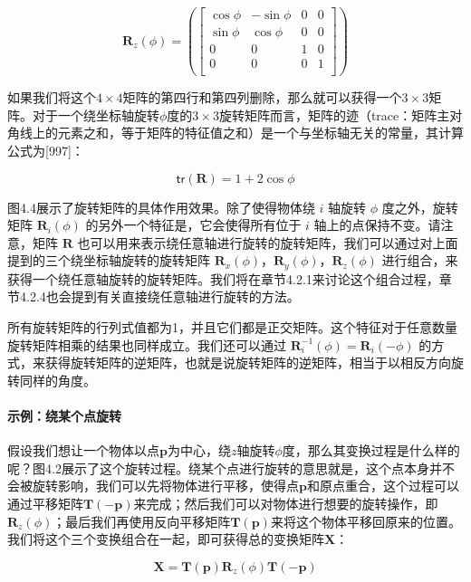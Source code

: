 \documentclass[
  paper=a4,
  ,captions=tableheading
]{scrartcl}
\begin{document}
\[
  \mathbf{R}_z(\phi) =
  \left (
  \begin{bmatrix}
      \cos \phi & -\sin \phi & 0 & 0 \\
      \sin \phi & \cos \phi  & 0 & 0 \\
      0         & 0          & 1 & 0 \\
      0         & 0          & 0 & 1 \\
    \end{bmatrix}
  \right)
  \tag{4.7}
\]

如果我们将这个\(4 \times 4\)矩阵的第四行和第四列删除，那么就可以获得一个\(3 \times 3\)矩阵。对于一个绕坐标轴旋转\(\phi\)度的\(3 \times 3\)旋转矩阵而言，矩阵的迹（trace：矩阵主对角线上的元素之和，等于矩阵的特征值之和）是一个与坐标轴无关的常量，其计算公式为{[}997{]}：

\[
  \mathsf{tr}\mathbf{(R)} = 1 + 2 \cos \phi \tag{4.8}
\]

图4.4展示了旋转矩阵的具体作用效果。除了使得物体绕 $i$ 轴旋转 $\phi$ 度之外，旋转矩阵 $\mathbf{R}_i(\phi)$ 的另外一个特征是，它会使得所有位于 $i$ 轴上的点保持不变。请注意，矩阵 $\mathbf{R}$ 也可以用来表示绕任意轴进行旋转的旋转矩阵，我们可以通过对上面提到的三个绕坐标轴旋转的旋转矩阵 $\mathbf{R}_x(\phi)$，$\mathbf{R}_y(\phi)$，$\mathbf{R}_z(\phi)$ 进行组合，来获得一个绕任意轴旋转的旋转矩阵。我们将在章节4.2.1来讨论这个组合过程，章节4.2.4也会提到有关直接绕任意轴进行旋转的方法。

所有旋转矩阵的行列式值都为1，并且它们都是正交矩阵。这个特征对于任意数量旋转矩阵相乘的结果也同样成立。我们还可以通过 $\mathbf{R}_i^{-1}(\phi) = \mathbf{R}_i(-\phi)$ 的方式，来获得旋转矩阵的逆矩阵，也就是说旋转矩阵的逆矩阵，相当于以相反方向旋转同样的角度。

\paragraph{示例：绕某个点旋转}\label{ux793aux4f8bux7ed5ux67d0ux4e2aux70b9ux65cbux8f6c}

假设我们想让一个物体以点\(\mathbf{p}\)为中心，绕\(z\)轴旋转\(\phi\)度，那么其变换过程是什么样的呢？图4.2展示了这个旋转过程。绕某个点进行旋转的意思就是，这个点本身并不会被旋转影响，我们可以先将物体进行平移，使得点\(\mathbf{p}\)和原点重合，这个过程可以通过平移矩阵\(\mathbf{T(-p)}\)来完成；然后我们可以对物体进行想要的旋转操作，即\(\mathbf{R}_z(\phi)\)；最后我们再使用反向平移矩阵\(\mathbf{T(p)}\)来将这个物体平移回原来的位置。我们将这个三个变换组合在一起，即可获得总的变换矩阵\(\mathbf{X}\)：

\[
  \mathbf{X} = \mathbf{T(p)} \mathbf{R}_z(\phi) \mathbf{T(-p)} \tag{4.9}
\]
\end{document}
